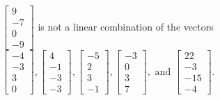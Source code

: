 \begin{exercise}
\begin{exerciseStatement}
  \end{exerciseStatement}
  \begin{exerciseAnswer}
   \(\left[\begin{array}{c}
9 \\
-7 \\
0 \\
-9
\end{array}\right]\) 
  	 is not  
	a linear combination of the vectors \(\left[\begin{array}{c}
-4 \\
-3 \\
3 \\
0
\end{array}\right] , \left[\begin{array}{c}
4 \\
-1 \\
-3 \\
-3
\end{array}\right] , \left[\begin{array}{c}
-5 \\
2 \\
3 \\
-1
\end{array}\right] , \left[\begin{array}{c}
-3 \\
0 \\
3 \\
7
\end{array}\right] , \text{ and } \left[\begin{array}{c}
22 \\
-3 \\
-15 \\
-4
\end{array}\right]\).

	
  


  \end{exerciseAnswer}
\end{exercise}